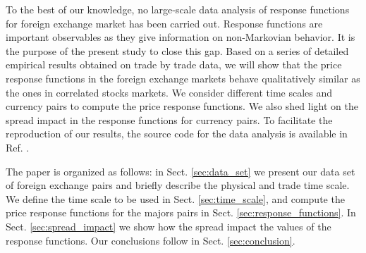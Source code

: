 To the best of our knowledge, no large-scale data analysis of response
functions for foreign exchange market has been carried out. Response functions
are important observables as they give information on non-Markovian behavior.
It is the purpose of the present study to close this gap. Based on a series of
detailed empirical results obtained on trade by trade data, we will show that
the price response functions in the foreign exchange markets behave
qualitatively similar as the ones in correlated stocks markets. We consider
different time scales and currency pairs to compute the price response
functions. We also shed light on the spread impact in the response functions
for currency pairs. To facilitate the reproduction of our results, the source
code for the data analysis is available in Ref. \cite{code}.

The paper is organized as follows: in Sect. \ref{sec:data_set} we present our
data set of foreign exchange pairs and briefly describe the physical and trade
time scale. We define the time scale to be used in Sect. \ref{sec:time_scale},
and compute the price response functions for the majors pairs in Sect.
\ref{sec:response_functions}. In Sect. \ref{sec:spread_impact} we show how
the spread impact the values of the response functions. Our conclusions follow
in Sect. \ref{sec:conclusion}.
